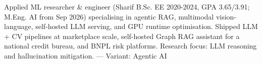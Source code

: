 \small{Applied ML researcher \& engineer (Sharif B.Sc. EE 2020-2024, GPA 3.65/3.91; M.Eng. AI from Sep 2026) specialising in agentic RAG, multimodal vision-language, self-hosted LLM serving, and GPU runtime optimisation. Shipped LLM + CV pipelines at marketplace scale, self-hosted Graph RAG assistant for a national credit bureau, and BNPL risk platforms. Research focus: LLM reasoning and hallucination mitigation.
 — Variant: Agentic AI}

